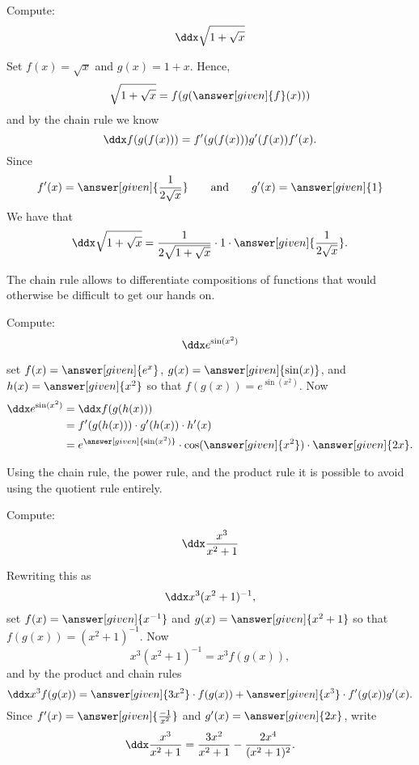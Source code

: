 \documentclass{ximera}
\begin{document}
\begin{example}
Compute:
\[
\ddx \sqrt{1+\sqrt{x}}
\]

\begin{explanation}
Set 
$f(x)=\sqrt{x}$ and $g(x)=1+x$. Hence,
\[
\sqrt{1+\sqrt{x}}=f(g(\answer[given]{f}(x)))
\]
and by the chain rule we know
\[
\ddx f(g(f(x))) = f'(g(f(x)))g'(f(x))f'(x).
\]
Since 
\[
f'(x) = \answer[given]{\frac{1}{2\sqrt{x}}} \qquad\text{and}\qquad g'(x) = \answer[given]{1}
\]
We have that
\[
\ddx \sqrt{1+\sqrt{x}} = \frac{1}{2\sqrt{1+\sqrt{x}}}\cdot 1\cdot  \answer[given]{\frac{1}{2\sqrt{x}}}.
\]
\end{explanation}
\end{example}

The chain rule allows to differentiate compositions of functions that
would otherwise be difficult to get our hands on.

\begin{example}
Compute:
\[
\ddx e^{\sin(x^2)}
\]

\begin{explanation}
set $f(x) = \answer[given]{e^x}$, $g(x) = \answer[given]{\sin(x)}$, and $h(x) = \answer[given]{x^2}$
so that $f(g(x)) = e^{\sin(x^2)}$. Now
\begin{align*}
  \ddx e^{\sin(x^2)} &= \ddx f(g(h(x)))\\
  &= f'(g(h(x))) \cdot g'(h(x)) \cdot h'(x)\\
  &= e^{\answer[given]{\sin(x^2)}} \cdot \cos(\answer[given]{x^2}) \cdot \answer[given]{2x}.
\end{align*}
\end{explanation}
\end{example}




Using the chain rule, the power rule, and the product rule it is
possible to avoid using the quotient rule entirely.

\begin{example}
Compute:
\[
\ddx \frac{x^3}{x^2+1}
\]

\begin{explanation}
Rewriting this as 
\[
\ddx x^3(x^2+1)^{-1}, 
\]
set $f(x) = \answer[given]{x^{-1}}$ and $g(x) = \answer[given]{x^2+1}$ so that $f(g(x)) = (x^2 + 1)^{-1}$. Now
\[
x^3(x^2+1)^{-1} = x^3 f(g(x)),
\]
and by the product and chain rules
\[
\ddx x^3 f(g(x)) = \answer[given]{3x^2} \cdot f(g(x))+ \answer[given]{x^3} \cdot f'(g(x))g'(x).
\]
Since $f'(x) = \answer[given]{\frac{-1}{x^2}}$ and $g'(x) = \answer[given]{2x}$, write
\[
\ddx \frac{x^3}{x^2+1} = \frac{3x^2}{x^2+1}-\frac{2x^4}{(x^2+1)^2}.
\]
\end{explanation}
\end{example}
\end{document}
